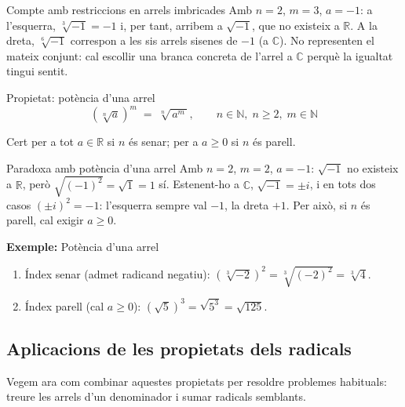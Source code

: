\begin{nota}{Compte amb restriccions en arrels imbricades}
Amb $n=2$, $m=3$, $a=-1$: a l'esquerra, $\sqrt[3]{-1}=-1$ i, per tant, arribem a $\sqrt{-1}$, que no existeix a $\mathbb{R}$. A la dreta, $\sqrt[6]{-1}$ correspon a les sis arrels sisenes de $-1$ (a $\mathbb{C}$). No representen el mateix conjunt: cal escollir una branca concreta de l'arrel a $\mathbb{C}$ perquè la igualtat tingui sentit.
\end{nota}

\begin{propietat}{Propietat: potència d'una arrel}
\[
\left(\sqrt[n]{a}\right)^{m} \;=\; \sqrt[n]{\,a^{m}\,},
\qquad n \in \mathbb{N},\; n\ge 2,\; m \in \mathbb{N}
\]

Cert per a tot $a\in\mathbb{R}$ si $n$ és senar; per a $a\ge 0$ si $n$ és parell.
\end{propietat}

\begin{nota}{Paradoxa amb potència d'una arrel}
Amb $n=2$, $m=2$, $a=-1$: $\sqrt{-1}$ no existeix a $\mathbb{R}$, però $\sqrt{(-1)^2}=\sqrt{1}=1$ sí. Estenent-ho a $\mathbb{C}$, $\sqrt{-1}=\pm i$, i en tots dos casos $(\pm i)^2=-1$: l'esquerra sempre val $-1$, la dreta $+1$. Per això, si $n$ és parell, cal exigir $a\ge 0$.
\end{nota}

\begin{exemple}{\textbf{Exemple:} Potència d'una arrel}
\begin{enumerate}
\item Índex senar (admet radicand negatiu): $\left(\sqrt[3]{-2}\right)^{2} = \sqrt[3]{(-2)^{2}} = \sqrt[3]{4}$.
\item Índex parell (cal $a\ge 0$): $\left(\sqrt{5}\right)^{3} = \sqrt{5^{3}} = \sqrt{125}$.
\end{enumerate}
\end{exemple}

\subsection{Aplicacions de les propietats dels radicals}

Vegem ara com combinar aquestes propietats per resoldre problemes habituals: treure les arrels d'un denominador i sumar radicals semblants.

